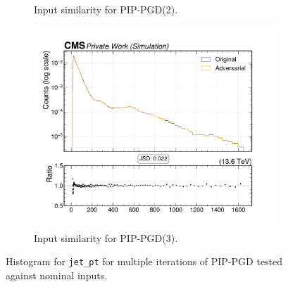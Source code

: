 \begin{figure}[htbp]
\begin{subfigure}[t]{0.32\textwidth}
    \caption*{Input similarity for PIP-PGD(2).}
  \end{subfigure}\hfill
  \begin{subfigure}[t]{0.32\textwidth}
    \includegraphics[width=\linewidth]{media/output/features/compare/combined_it_3/cmp_global_features_jet_pt.pdf}
    \caption*{Input similarity for PIP-PGD(3).}
  \end{subfigure}

  \caption*{Histogram for \texttt{jet\_pt} for multiple iterations of PIP-PGD tested against nominal inputs.}
  \label{fig:combined_input_jet_pt}
\end{figure}

